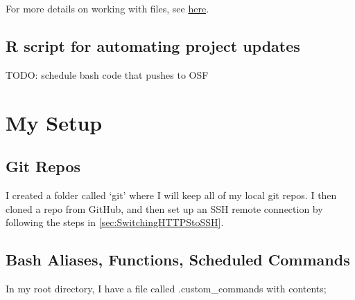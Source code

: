 \documentclass[]{article}
\newenvironment{Shaded}{\begin{snugshade}}{\end{snugshade}}
\newcommand{\KeywordTok}[1]{\textcolor[rgb]{0.13,0.29,0.53}{\textbf{#1}}}
\newcommand{\StringTok}[1]{\textcolor[rgb]{0.31,0.60,0.02}{#1}}
\newcommand{\CommentTok}[1]{\textcolor[rgb]{0.56,0.35,0.01}{\textit{#1}}}
\newcommand{\OperatorTok}[1]{\textcolor[rgb]{0.81,0.36,0.00}{\textbf{#1}}}
\newcommand{\NormalTok}[1]{#1}
\begin{document}
For more details on working with files, see
\href{http://centerforopenscience.github.io/osfr/articles/getting_started.html}{\color{blue}here}.

\subsection{R script for automating project updates}

TODO: schedule bash code that pushes to OSF

\begin{Shaded}
\end{Shaded}

\section{My Setup}

\subsection{Git Repos}

I created a folder called `git' where I will keep all of my local git
repos. I then cloned a repo from GitHub, and then set up an SSH remote
connection by following the steps in \ref{sec:SwitchingHTTPStoSSH}.

\subsection{Bash Aliases, Functions, Scheduled Commands}

In my root directory, I have a file called .custom\_commands with
contents;
\end{document}
